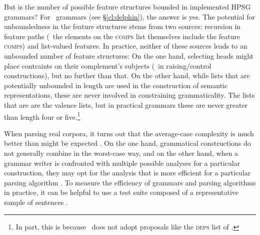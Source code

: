 \documentclass[output=paper,nonflat]{langsci/langscibook}
\begin{document}
But is the number of possible feature structures bounded in
implemented HPSG grammars? For \delphin\ grammars (see
\S\ref{cl:delphin}), the answer is yes. The potential for
unboundedness in the feature structures stems from two sources:
recursion in feature paths (\eg\ the elements on the \textsc{comps}
list themselves include the feature \textsc{comps}) and list-valued
features. In practice, neither of these sources leads to an unbounded
number of feature structures: On the one hand, selecting heads might
place contraints on their complement's subjects (\eg\ in
raising/control constructions), but no further than that. On the other
hand, while lists that are potentially unbounded in length are used in
the construction of semantic representations, these are never involved
in constraining grammaticality. The lists that are are the valence
lists, but in practical grammars these are never greater than length
four or five.\footnote{In part, this is because \delphin\ does not
adopt proposals like the \textsc{deps} list of \citet{BMS2001a-unlinked}.}

When parsing real corpora,
it turns out that the average-case complexity is much better than might be expected \citep{Carroll94}.
On the one hand, grammatical constructions do not generally combine in the worst-case way,
and on the other hand, when a grammar writer is confronted
with multiple possible analyses for a particular construction,
they may opt for the analysis that is more efficient for a particular parsing algorithm \citep{Flickinger2000a}.
To measure the efficiency of grammars and parsing algorithms in practice,
it can be helpful to use a test suite composed of a representative sample of sentences \citep{OF98}.

\end{document}
